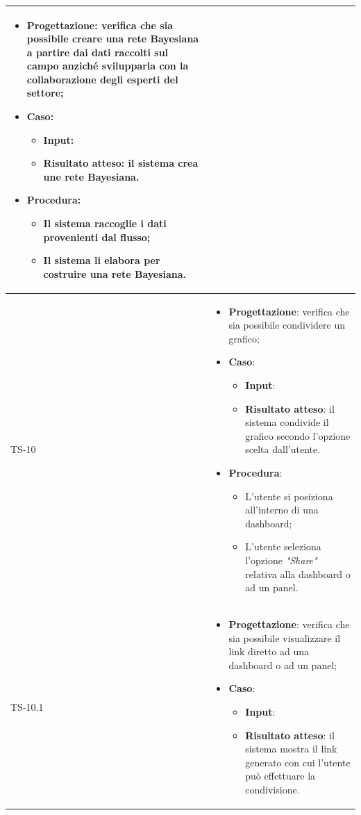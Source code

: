 \begin{longtable}{|C{2.5cm}|C{13cm}|}
\begin{itemize}
	\item \textbf{Progettazione}: verifica che sia  possibile creare una rete
	Bayesiana a partire dai dati raccolti sul campo anziché svilupparla con la
	collaborazione degli esperti del settore;
	\item \textbf{Caso}: 
	\begin{itemize}
		\item \textbf{Input}:
		\item \textbf{Risultato atteso}: il sistema crea une rete Bayesiana.
	\end{itemize}
	\item \textbf{Procedura}:
	\begin{itemize}
		\item Il sistema raccoglie i dati provenienti dal flusso;
		\item Il sistema li elabora per costruire una rete Bayesiana.
	\end{itemize} 
\end{itemize} \\
\hline
	{TS-10} &
\begin{itemize}
	\item \textbf{Progettazione}: verifica che sia possibile condividere un
	grafico;
	\item \textbf{Caso}: 
	\begin{itemize}
		\item \textbf{Input}: 
		\item \textbf{Risultato atteso}: il sistema condivide il grafico secondo l'opzione scelta dall'utente.
	\end{itemize}
	\item \textbf{Procedura}:
	\begin{itemize}
		\item L'utente si posiziona all'interno di una dashboard;
		\item L'utente seleziona l'opzione \emph{"Share"} relativa alla dashboard o ad un panel.
	\end{itemize} 
\end{itemize}
	  \\
	\hline
	{TS-10.1} & 
\begin{itemize}
	\item \textbf{Progettazione}: verifica che sia possibile visualizzare il
	link diretto ad una dashboard o ad un panel;
	\item \textbf{Caso}: 
	\begin{itemize}
		\item \textbf{Input}: 
		\item \textbf{Risultato atteso}: il sistema mostra il link generato con cui l'utente può effettuare la condivisione.

\end{itemize}
\end{itemize}
\end{longtable}
